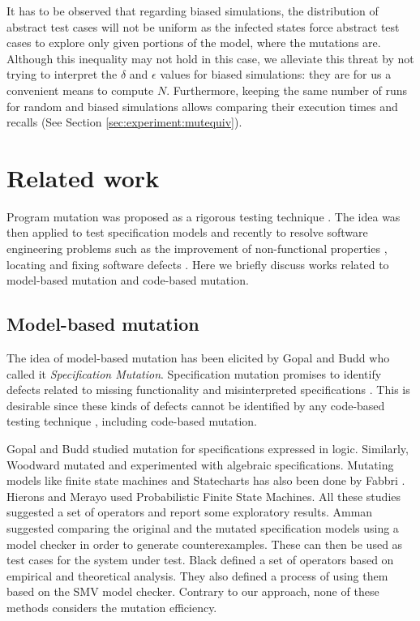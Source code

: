It has to be observed that regarding biased simulations, the distribution of abstract test cases will not be uniform as the infected states force abstract test cases to explore only given portions of the model, \viz where the mutations are. Although this inequality may not hold in this case, we alleviate this threat by not trying to interpret the $\delta$ and $\epsilon$ values for biased simulations: they are for us a convenient means to compute $N$. Furthermore, keeping the same number of runs for random and biased simulations allows comparing their execution times and recalls (See Section \ref{sec:experiment:mutequiv}).


\section{Related work}

Program mutation was proposed as a rigorous testing technique \cite{Budd1980}. The idea was then applied to test specification models \cite{Offutt2011} and recently to resolve software engineering problems such as the improvement of non-functional properties \cite{Langdon2015}, locating \cite{Papadakis2015a} and fixing software defects \cite{LeGoues2012}. Here we briefly discuss works related to model-based mutation and code-based mutation.

\subsection{Model-based mutation}

The idea of model-based mutation has been elicited by Gopal and Budd \cite{Budd1985} who called it \textit{Specification Mutation}. Specification mutation promises to identify defects related to missing functionality and misinterpreted specifications \cite{Budd1985}. This is desirable since these kinds of defects cannot be identified by any code-based testing technique \cite{Howden1976,Voas1997}, including code-based mutation. 

Gopal and Budd \cite{Budd1985} studied mutation for specifications expressed in logic. Similarly, Woodward \cite{Woodward1993} mutated and experimented with algebraic specifications. Mutating models like finite state machines and Statecharts has also been done by Fabbri \etal \cite{Fabbri1999b}. Hierons and Merayo \cite{Hierons2009} used Probabilistic Finite State Machines. All these studies suggested a set of operators and report some exploratory results.  Amman \etal \cite{Ammann1998} suggested comparing the original and the mutated specification models using a model checker in order to generate counterexamples. These can then be used as test cases for the system under test. Black \etal \cite{Black2000} defined a set of operators based on empirical and theoretical analysis. They also defined a process of using them based on the SMV model checker. Contrary to our approach, none of these methods considers the mutation efficiency.

